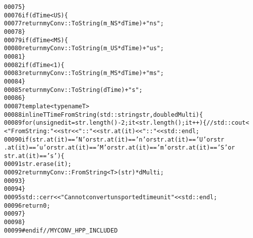 \begin{footnotesize}
\begin{alltt}
00075         \}
00076         \textcolor{keywordflow}{if} (dTime < US)\{
00077             \textcolor{keywordflow}{return} myConv::ToString(m\_NS * dTime)+\textcolor{stringliteral}{"ns"};
00078         \}
00079         \textcolor{keywordflow}{if}(dTime < MS)\{
00080             \textcolor{keywordflow}{return} myConv::ToString(m\_US * dTime)+\textcolor{stringliteral}{"us"};
00081         \}
00082         \textcolor{keywordflow}{if}(dTime < 1)\{
00083             \textcolor{keywordflow}{return} myConv::ToString(m\_MS * dTime)+\textcolor{stringliteral}{"ms"};
00084         \}
00085         \textcolor{keywordflow}{return} myConv::ToString(dTime)+\textcolor{stringliteral}{"s"};
00086     \}
00087     \textcolor{keyword}{template} <\textcolor{keyword}{typename} T>
00088     \textcolor{keyword}{inline} T TimeFromString(std::string str, \textcolor{keywordtype}{double} dMulti)\{
00089         \textcolor{keywordflow}{for} (\textcolor{keywordtype}{unsigned} it = str.length()-2; it < str.length(); it++)\{ \textcolor{comment}{//std::cout<
      <"FromString: "<<str<<"::"<<str.at(it)<<"::"<<std::endl;}
00090             \textcolor{keywordflow}{if}(str.at(it) == \textcolor{charliteral}{'N'} or str.at(it) == \textcolor{charliteral}{'n'} or str.at(it) == \textcolor{charliteral}{'U'} or str
      .at(it) == \textcolor{charliteral}{'u'} or str.at(it) == \textcolor{charliteral}{'M'} or str.at(it) == \textcolor{charliteral}{'m'} or str.at(it) == \textcolor{charliteral}{'S'} or 
      str.at(it) == \textcolor{charliteral}{'s'})\{
00091                     str.erase(it);
00092                     \textcolor{keywordflow}{return} myConv::FromString<T>(str) * dMulti;
00093             \}
00094         \}
00095         std::cerr<<\textcolor{stringliteral}{"Cannot convert unsported time unit"}<<std::endl;
00096         \textcolor{keywordflow}{return} 0;
00097     \}
00098 \}
00099 \textcolor{preprocessor}{#endif // MYCONV\_HPP\_INCLUDED}
\end{alltt}\end{footnotesize}
